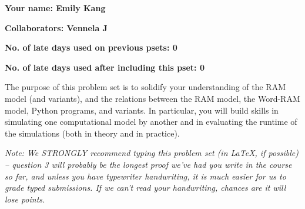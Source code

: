 \documentclass[11pt]{article}
\begin{document}

\textbf{Your name: Emily Kang}

\textbf{Collaborators: Vennela J}

\textbf{No. of late days used on previous psets: 0}

\textbf{No. of late days used after including this pset: 0}


The purpose of this problem set is to solidify your understanding of the RAM model (and variants), and the relations between the RAM model, the Word-RAM model, Python programs, and variants. In particular, you will build skills in simulating one computational model by another and in evaluating the runtime of the simulations (both in theory and in practice).

\textit{Note: We STRONGLY recommend typing this problem set (in LaTeX, if possible) -- question 3 will probably be the longest proof we've had you write in the course so far, and unless you have typewriter handwriting, it is much easier for us to grade typed submissions. If we can't read your handwriting, chances are it will lose points.}
\end{document}
